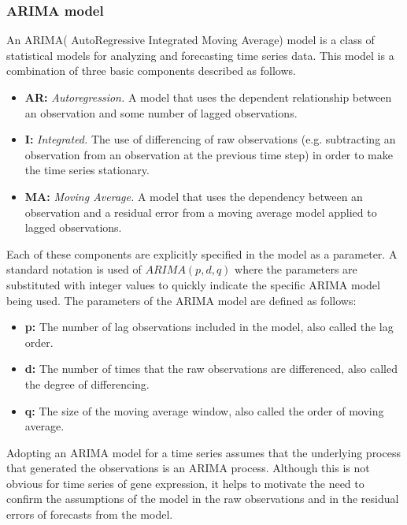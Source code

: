 \subsubsection{ARIMA model}
An ARIMA( AutoRegressive Integrated Moving Average) \cite{arima} model is a class of statistical models for analyzing and forecasting time series data. This model is a combination of three basic components described as follows.
\begin{itemize}
    \item \textbf{AR:} \textit{Autoregression.} A model that uses the dependent relationship between an observation and some number of lagged observations.
    \item \textbf{I:} \textit{Integrated.} The use of differencing of raw observations (e.g. subtracting an observation from an observation at the previous time step) in order to make the time series stationary.
    \item \textbf{MA:} \textit{Moving Average.} A model that uses the dependency between an observation and a residual error from a moving average model applied to lagged observations.
\end{itemize}
Each of these components are explicitly specified in the model as a parameter. A standard notation is used of $ARIMA(p,d,q)$ where the parameters are substituted with integer values to quickly indicate the specific ARIMA model being used. The parameters of the ARIMA model are defined as follows:
\begin{itemize}
    \item \textbf{p:} The number of lag observations included in the model, also called the lag order.
    \item \textbf{d:} The number of times that the raw observations are differenced, also called the degree of differencing.
    \item \textbf{q:} The size of the moving average window, also called the order of moving average.
\end{itemize}
Adopting an ARIMA model for a time series assumes that the underlying process that generated the observations is an ARIMA process. Although this is not obvious for time series of gene expression, it helps to motivate the need to confirm the assumptions of the model in the raw observations and in the residual errors of forecasts from the model.
